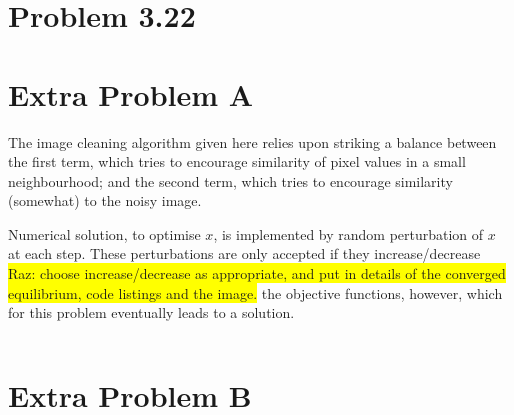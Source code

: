 \documentclass[11pt,a4paper,oneside]{report}
\newcommand{\hilight}[1]{\colorbox{yellow}{#1}}
\begin{document}
\section*{Problem 3.22}


\section*{Extra Problem A}
The image cleaning algorithm given here relies upon striking a balance between
the first term, which tries to encourage similarity of pixel values in a small
neighbourhood; and the second term, which tries to encourage similarity
(somewhat) to the noisy image. 

Numerical solution, to optimise $x$, is implemented by random perturbation of
$x$ at each step. These perturbations are only accepted if they
increase/decrease \hilight{Raz: choose increase/decrease as appropriate, and
put in details of the converged equilibrium, code listings and the image.} the objective functions, however, which for this problem
eventually leads to a solution.

\begin{figure}
\end{figure}

\begin{lstlisting}
\end{lstlisting}

\section*{Extra Problem B}
\end{document}
